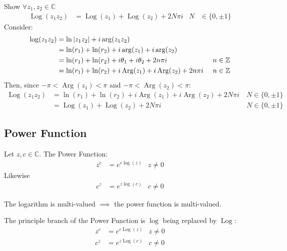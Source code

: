 \documentclass[12pt, english]{book}
\begin{document}
	\begin{example}
		Show \(\forall z_1, z_2 \in \mathbb{C}\)
		\begin{align*}
			\operatorname{Log}(z_1 z_2) &= \operatorname{Log}(z_1) + \operatorname{Log}(z_2) + 2N\pi i & N &\in \{0, \pm 1\}
		\end{align*}
		{\color{Grey}
		Consider:
		\begin{align*}
			\log(z_1 z_2) 
			&= \ln\abs{z_1 z_2} + i\arg(z_1 z_2) \\
			&= \ln(r_1) + \ln(r_2) + i\arg(z_1) + i\arg(z_2) \\
			&= \ln(r_1) + \ln(r_2) + i\theta_1 + i\theta_2 + 2n\pi i & \ n\in \mathbb{Z} \\
			&= \ln(r_1) + \ln(r_2) + i\operatorname{Arg}(z_1) + i\operatorname{Arg}(z_2) + 2n \pi i & \ n\in \mathbb{Z}
		\end{align*}
		Then, since \(-\pi < \operatorname{Arg}(z_1)<\pi\) and \(-\pi < \operatorname{Arg}(z_2)<\pi\):
		\begin{align*}
			\operatorname{Log}(z_1 z_2) 
			&= \ln(r_1) + \ln(r_2) + i\operatorname{Arg}(z_1) + i\operatorname{Arg}(z_2) + 2N \pi i & \ N\in \{0, \pm 1\} \\
			&=\operatorname{Log}(z_1) + \operatorname{Log}(z_2) + 2N \pi i & \ N\in \{0, \pm 1\} 
		\end{align*}
		}
	\end{example}

	\subsection{Power Function} \label{Power Function Subsection - Complex}
	
	\begin{definition}
		\label{Power Function Definition - Complex}
		Let \(z, c \in \mathbb{C}\). The Power Function: 
		\begin{align*}
			z^c &= e^{c \log(z)} & z\neq 0
		\end{align*}
		Likewise
		\begin{align*}
			c^z &= e^{z \log(c)} & c\neq 0
		\end{align*}
	\end{definition}
	The logarithm is multi-valued \(\implies\) the power function is multi-valued.
	
	The principle branch of the Power Function is \(\log\) being replaced by \(\operatorname{Log}\):
	\begin{align*}
		z^c &= e^{c \operatorname{Log}(z)} & z\neq 0 \\
		c^z &= e^{z \operatorname{Log}(c)} & c\neq 0
	\end{align*}
\end{document}

